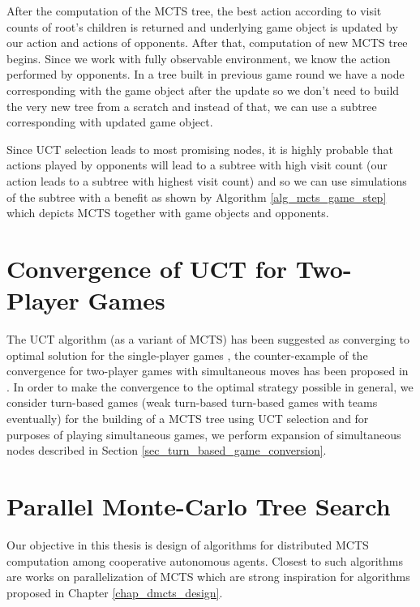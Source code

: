 After the computation of the MCTS tree, the best action according to visit counts of root's
children is returned and underlying game object is updated by our action and actions of
opponents. After that, computation of new MCTS tree begins. Since we work with fully observable
environment, we know the action performed by opponents. In a tree built in previous game round
we have a node corresponding with the game object after the update so we don't need to build
the very new tree from a scratch and instead of that, we can use a subtree corresponding with
updated game object.

Since UCT selection leads to most promising nodes, it is highly probable
that actions played by opponents will lead to a subtree with high visit count (our action leads
to a subtree with highest visit count) and so we can use simulations of the subtree with a
benefit as shown by Algorithm \ref{alg_mcts_game_step} which depicts MCTS together with game
objects and opponents.


\section{Convergence of UCT for Two-Player Games}
\label{sec_minimax_convergence}

The UCT algorithm (as a variant of MCTS) has been suggested as converging to optimal solution for the
single-player games \cite{Kocsis2006}, the counter-example of the convergence for two-player
games with simultaneous moves has been proposed in \cite{Shafiei2009}. In order to make the
convergence to the optimal strategy possible in general, we
consider turn-based games (weak turn-based turn-based games with teams eventually) for the 
building of a MCTS tree using UCT
selection and for purposes of playing simultaneous games, we perform expansion of simultaneous
nodes described in Section \ref{sec_turn_based_game_conversion}.




\section{Parallel Monte-Carlo Tree Search}
\label{sec_parallel_mcts}

Our objective in this thesis is design of algorithms for distributed MCTS computation among
cooperative autonomous agents. Closest to such algorithms are works on parallelization of MCTS 
which are
strong inspiration for algorithms proposed in Chapter \ref{chap_dmcts_design}.

